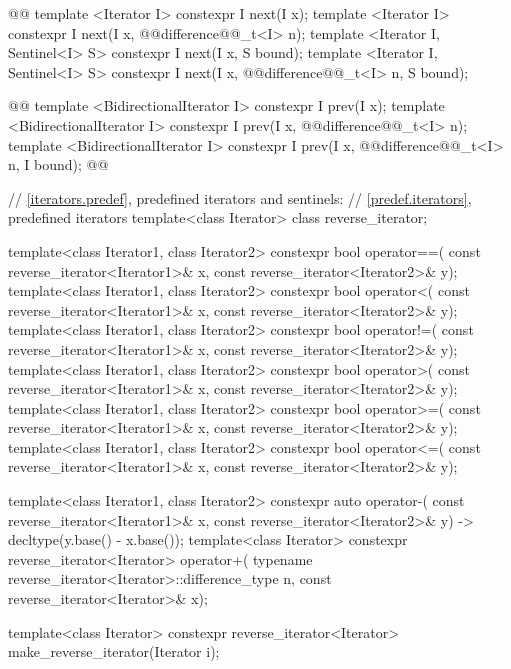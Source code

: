 \begin{codeblock}
{    @@
    template <Iterator I>
      constexpr I next(I x);
    template <Iterator I>
      constexpr I next(I x, @@difference@@_t<I> n);
    template <Iterator I, Sentinel<I> S>
      constexpr I next(I x, S bound);
    template <Iterator I, Sentinel<I> S>
      constexpr I next(I x, @@difference@@_t<I> n, S bound);

    @@
    template <BidirectionalIterator I>
      constexpr I prev(I x);
    template <BidirectionalIterator I>
      constexpr I prev(I x, @@difference@@_t<I> n);
    template <BidirectionalIterator I>
      constexpr I prev(I x, @@difference@@_t<I> n, I bound);
  @\added{\}}@

  // \ref{iterators.predef}, predefined iterators and sentinels:
  // \ref{predef.iterators}, predefined iterators
  template<class Iterator> class reverse_iterator;

  template<class Iterator1, class Iterator2>
    constexpr bool operator==(
      const reverse_iterator<Iterator1>& x,
      const reverse_iterator<Iterator2>& y);
  template<class Iterator1, class Iterator2>
    constexpr bool operator<(
      const reverse_iterator<Iterator1>& x,
      const reverse_iterator<Iterator2>& y);
  template<class Iterator1, class Iterator2>
    constexpr bool operator!=(
      const reverse_iterator<Iterator1>& x,
      const reverse_iterator<Iterator2>& y);
  template<class Iterator1, class Iterator2>
    constexpr bool operator>(
      const reverse_iterator<Iterator1>& x,
      const reverse_iterator<Iterator2>& y);
  template<class Iterator1, class Iterator2>
    constexpr bool operator>=(
      const reverse_iterator<Iterator1>& x,
      const reverse_iterator<Iterator2>& y);
  template<class Iterator1, class Iterator2>
    constexpr bool operator<=(
      const reverse_iterator<Iterator1>& x,
      const reverse_iterator<Iterator2>& y);

  template<class Iterator1, class Iterator2>
    constexpr auto operator-(
      const reverse_iterator<Iterator1>& x,
      const reverse_iterator<Iterator2>& y) -> decltype(y.base() - x.base());
  template<class Iterator>
    constexpr reverse_iterator<Iterator>
      operator+(
    typename reverse_iterator<Iterator>::difference_type n,
    const reverse_iterator<Iterator>& x);

  template<class Iterator>
    constexpr reverse_iterator<Iterator> make_reverse_iterator(Iterator i);

}
\end{codeblock}

